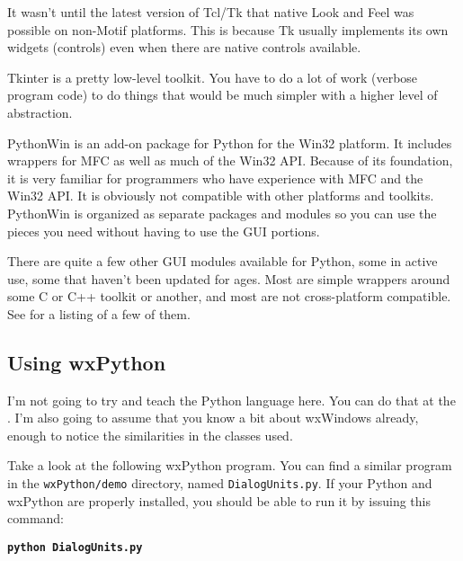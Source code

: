 It wasn't until the latest version of Tcl/Tk that native Look and
Feel was possible on non-Motif platforms. This is because Tk
usually implements its own widgets (controls) even when there are
native controls available.

Tkinter is a pretty low-level toolkit. You have to do a lot of work
(verbose program code) to do things that would be much simpler with a higher
level of abstraction.


PythonWin is an add-on package for Python for the Win32 platform. It
includes wrappers for MFC as well as much of the Win32 API. Because
of its foundation, it is very familiar for programmers who have
experience with MFC and the Win32 API. It is obviously not compatible
with other platforms and toolkits. PythonWin is organized as separate
packages and modules so you can use the pieces you need without having
to use the GUI portions.


There are quite a few other GUI modules available for Python, some in
active use, some that haven't been updated for ages. Most are simple
wrappers around some C or C++ toolkit or another, and most are not
cross-platform compatible. See 
for a listing of a few of them.

\subsection{Using wxPython}\label{wxpusing}


I'm not going to try and teach the Python language here. You can do
that at the .
I'm also going to assume that you know a bit about wxWindows already,
enough to notice the similarities in the classes used.

Take a look at the following wxPython program. You can find a similar
program in the {\tt wxPython/demo} directory, named {\tt DialogUnits.py}. If your
Python and wxPython are properly installed, you should be able to run
it by issuing this command:

\begin{indented}{1cm}
    {\bf\tt python DialogUnits.py}
\end{indented}

